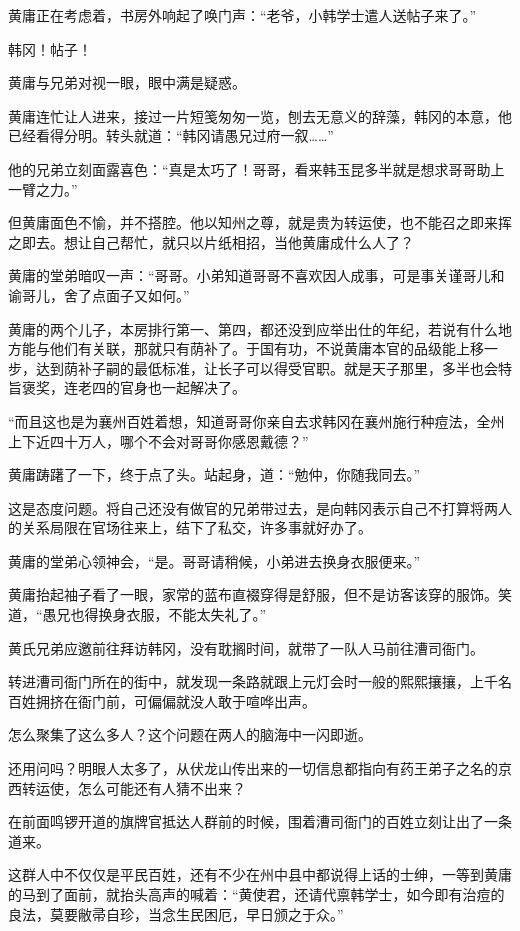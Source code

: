 黄庸正在考虑着，书房外响起了唤门声：“老爷，小韩学士遣人送帖子来了。”

韩冈！帖子！

黄庸与兄弟对视一眼，眼中满是疑惑。

黄庸连忙让人进来，接过一片短笺匆匆一览，刨去无意义的辞藻，韩冈的本意，他已经看得分明。转头就道：“韩冈请愚兄过府一叙……”

他的兄弟立刻面露喜色：“真是太巧了！哥哥，看来韩玉昆多半就是想求哥哥助上一臂之力。”

但黄庸面色不愉，并不搭腔。他以知州之尊，就是贵为转运使，也不能召之即来挥之即去。想让自己帮忙，就只以片纸相招，当他黄庸成什么人了？

黄庸的堂弟暗叹一声：“哥哥。小弟知道哥哥不喜欢因人成事，可是事关谨哥儿和谕哥儿，舍了点面子又如何。”

黄庸的两个儿子，本房排行第一、第四，都还没到应举出仕的年纪，若说有什么地方能与他们有关联，那就只有荫补了。于国有功，不说黄庸本官的品级能上移一步，达到荫补子嗣的最低标准，让长子可以得受官职。就是天子那里，多半也会特旨褒奖，连老四的官身也一起解决了。

“而且这也是为襄州百姓着想，知道哥哥你亲自去求韩冈在襄州施行种痘法，全州上下近四十万人，哪个不会对哥哥你感恩戴德？”

黄庸踌躇了一下，终于点了头。站起身，道：“勉仲，你随我同去。”

这是态度问题。将自己还没有做官的兄弟带过去，是向韩冈表示自己不打算将两人的关系局限在官场往来上，结下了私交，许多事就好办了。

黄庸的堂弟心领神会，“是。哥哥请稍候，小弟进去换身衣服便来。”

黄庸抬起袖子看了一眼，家常的蓝布直裰穿得是舒服，但不是访客该穿的服饰。笑道，“愚兄也得换身衣服，不能太失礼了。”

黄氏兄弟应邀前往拜访韩冈，没有耽搁时间，就带了一队人马前往漕司衙门。

转进漕司衙门所在的街中，就发现一条路就跟上元灯会时一般的熙熙攘攘，上千名百姓拥挤在衙门前，可偏偏就没人敢于喧哗出声。

怎么聚集了这么多人？这个问题在两人的脑海中一闪即逝。

还用问吗？明眼人太多了，从伏龙山传出来的一切信息都指向有药王弟子之名的京西转运使，怎么可能还有人猜不出来？

在前面鸣锣开道的旗牌官抵达人群前的时候，围着漕司衙门的百姓立刻让出了一条道来。

这群人中不仅仅是平民百姓，还有不少在州中县中都说得上话的士绅，一等到黄庸的马到了面前，就抬头高声的喊着：“黄使君，还请代禀韩学士，如今即有治痘的良法，莫要敝帚自珍，当念生民困厄，早日颁之于众。”

